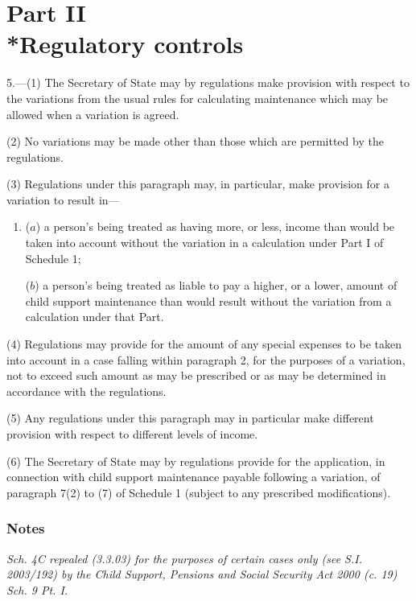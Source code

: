 \documentclass[a4paper]{article}
\newcommand\amendment[1]{\subsubsection*{Notes}{\itshape\frenchspacing\footnotesize #1 \par}}
\begin{document}
{\section[Part II --- Regulatory controls]{Part II\\*Regulatory controls}

5.—(1) The Secretary of State may by regulations make provision with respect
to the variations from the usual rules for calculating maintenance which may be
allowed when a variation is agreed.

(2)
No variations may be made other than those which are permitted by the regulations.

(3)
Regulations under this paragraph may, in particular, make provision for a variation to result in---
\begin{enumerate}\item[]
($a$) a person’s being treated as having more, or less, income than would
be taken into account without the variation in a calculation under
Part I of Schedule 1;

($b$) a person’s being treated as liable to pay a higher, or a lower, amount of
child support maintenance than would result without the variation from a
calculation under that Part.
\end{enumerate}

(4)
Regulations may provide for the amount of any special expenses to be taken into account in a case falling within paragraph 2, for the purposes of a variation, not to exceed such amount as may be prescribed or as may be determined in accordance with the regulations.

(5)
Any regulations under this paragraph may in particular make different provision with respect to different levels of income.

(6)
The Secretary of State may by regulations provide for the application, in connection with child support maintenance payable following a variation, of paragraph 7(2) to (7) of Schedule 1 (subject to any prescribed modifications).

\amendment{
Sch. 4C repealed (3.3.03) for the purposes of certain cases only (see S.I. 2003/192) by the Child Support, Pensions and Social Security Act 2000 (c. 19) Sch. 9 Pt. I.
}

}
\end{document}
